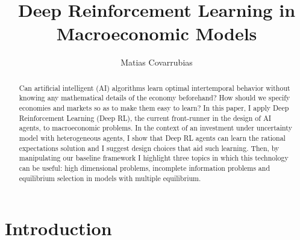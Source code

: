 \documentclass[11pt,english]{article}
\begin{document}
\title{Deep Reinforcement Learning in Macroeconomic Models}
\author{Matias Covarrubias}
\maketitle
\begin{abstract}
Can artificial intelligent (AI) algorithms learn optimal intertemporal behavior without knowing any mathematical details of the economy beforehand?  How should we specify economies and markets so as to make them easy to learn? In this paper, I apply Deep Reinforcement Learning (Deep RL), the current front-runner in the design of AI agents, to macroeconomic problems. In the context of an investment under uncertainty model with heterogeneous agents, I show that Deep RL agents can learn the rational expectations solution and I suggest design choices that aid such learning. Then, by manipulating our baseline framework I highlight three topics in which this technology can be useful: high dimensional problems, incomplete information problems and equilibrium selection in models with multiple equilibrium.
\end{abstract}

\newpage 
\section{Introduction}
\end{document}

